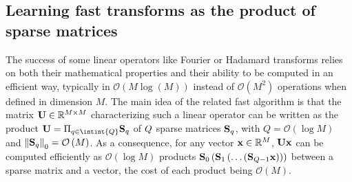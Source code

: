 %
%


%
%
%


\subsection{Learning fast transforms as the product of sparse matrices}
\label{sec:palm4msa}

The success of some linear operators like Fourier or Hadamard transforms relies on both their mathematical properties and their ability to be computed in an efficient way, typically in $\mathcal{O}\left (M\log\left (M\right )\right )$ instead of $\mathcal{O}\left (M^2\right )$ operations when defined in dimension $M$. 
The main idea of the related fast algorithm is that the matrix ${\mathbf{U}}\in{\mathbb{R}}^{M\times M}$ characterizing such a linear operator can be written as the product $\rmU=\Pi_{q\in\intint{\nfactors}}\rmS_q$ of $Q$ sparse matrices ${\mathbf{S}}_q$, with $Q=\mathcal{O}\left (\log M\right )$ and $\left \|{\mathbf{S}}_q\right \|_0=\mathcal{O}\left (M\right )$.
As a consequence, for any vector ${\mathbf{x}}\in{\mathbb{R}}^M$, ${\mathbf{U}}{\mathbf{x}}$ can be computed efficiently as $\mathcal{O}\left (\log M\right )$ products ${\mathbf{S}}_0 \left ({\mathbf{S}}_1 \left (\ldots \left ({\mathbf{S}}_{Q-1}{\mathbf{x}}\right )\right )\right )$ between a sparse matrix and a vector, the cost of each product being $\mathcal{O}\left (M\right )$.

